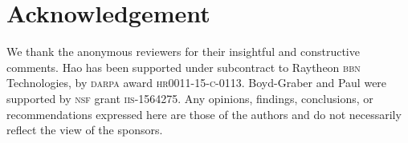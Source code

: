 \section*{Acknowledgement}

We thank the anonymous reviewers for their insightful and constructive
comments. Hao has been supported under subcontract
to Raytheon \textsc{bbn} Technologies, by \textsc{darpa} award
\textsc{hr0011-15-c-0113}. Boyd-Graber and Paul were supported by
\textsc{nsf} grant \textsc{iis}-1564275. Any opinions, findings, conclusions, or
recommendations expressed here are those of the authors and do not
necessarily reflect the view of the sponsors.